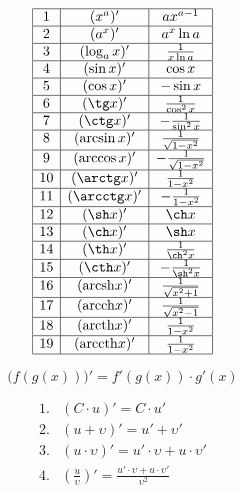 \documentclass{article}
\newcommand{\arcsh}{\mathrm{arcsh}}
\newcommand{\arcch}{\mathrm{arcch}}
\newcommand{\arcth}{\mathrm{arcth}}
\newcommand{\arccth}{\mathrm{arccth}}
\begin{document}
\begin{displaymath}
\begin{array}{|c|c|c|}

  \hline
  1 &		(x^{a})'		    &	ax^{a-1}\\
  \hline
  2 &		(a^{x})'		    &	a^{x}\ln a\\
  \hline
  3 &		(\log_{a}x)'	  &	\frac{1}{x\ln a}\\
  \hline
  4 &		(\sin x)'			  &	\cos x\\
  \hline
  5 &		(\cos x)'		    &	-\sin x\\
  \hline
  6 &		(\tg x)'			  &	\frac{1}{\cos^{2} x}\\
  \hline
  7 & 	(\ctg x)'		    &	-\frac{1}{\sin^{2} x}\\
  \hline
  8 &		(\arcsin x)'		&	\frac{1}{\sqrt{1-x^{2}}}\\
  \hline
  9 &		(\arccos x)'		&	-\frac{1}{\sqrt{1-x^{2}}}\\
  \hline
  10&	(\arctg x)'		    &	\frac{1}{1-x^{2}}\\
  \hline
  11&	(\arcctg x)'		  &	-\frac{1}{1-x^{2}}\\
  \hline
  12&	(\sh x)'			    &	\ch x\\
  \hline
  13&	(\ch x)'			    &	\sh x\\
  \hline
  14&	(\th x)' 			    &	\frac{1}{\ch^{2} x}\\
  \hline
  15&	(\cth x)'		      &	-\frac{1}{\sh^{2} x}\\
  \hline
  16&	(\arcsh x)'		    &	\frac{1}{\sqrt{x^{2}+1}}\\
  \hline
  17&	(\arcch x)'		    &	\frac{1}{\sqrt{x^{2}-1}}\\
  \hline
  18&	(\arcth x)'		    &	\frac{1}{1-x^{2}}\\
  \hline
  19&	(\arccth x)'		  &	\frac{1}{1-x^{2}}\\
  \hline

\end{array}
\end{displaymath}

\[   \Big(f(g(x))\Big) ' = f'(g(x)) \cdot g'(x)  \]

\begin{displaymath}
\begin{array}{cl}

  1.&  (C\cdot u)'                         =   C\cdot u'\\
  2.&  \left(u + \upsilon       \right)'   =   u' + \upsilon'\\
  3.&  \left(u\cdot \upsilon    \right)'   =   u'\cdot\upsilon + u\cdot\upsilon' \\
  4.&  \left(\frac{u}{\upsilon} \right)'   =   \frac{u'\cdot\upsilon + u\cdot\upsilon'}{\upsilon^2}\\

\end{array}
\end{displaymath}
\end{document}
